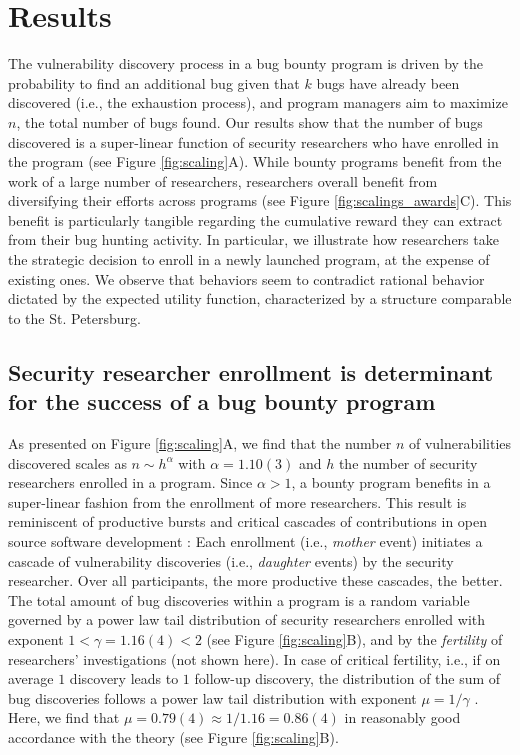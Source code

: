 \section{Results}
\label{sec:results}
The vulnerability discovery process in a bug bounty program is driven by the probability to find an additional bug given that $k$ bugs have already been discovered (i.e., the exhaustion process), and program managers aim to maximize $n$, the total number of bugs found. Our results show that the number of bugs discovered is a super-linear function of security researchers who have enrolled in the program (see Figure \ref{fig:scaling}A). While bounty programs benefit from the work of a large number of researchers, researchers overall benefit from diversifying their efforts across programs (see Figure \ref{fig:scalings_awards}C). This benefit is particularly tangible regarding the cumulative reward they can extract from their bug hunting activity. In particular, we illustrate how researchers take the strategic decision to enroll in a newly launched program, at the expense of existing ones. We observe that behaviors seem to contradict rational behavior dictated by the expected utility function, characterized by a structure comparable to the St. Petersburg.
 
\subsection{Security researcher enrollment is determinant for the success of a bug bounty program}
As presented on Figure \ref{fig:scaling}A, we find that the number $n$ of vulnerabilities discovered scales as $n \sim h^{\alpha}$ with $\alpha = 1.10(3)$ and $h$ the number of security researchers enrolled in a program. Since $\alpha > 1$, a bounty program benefits in a super-linear fashion from the enrollment of more researchers. This result is reminiscent of productive bursts and critical cascades of contributions in open source software development \cite{sornette2014much}: Each enrollment (i.e., {\it mother} event) initiates a cascade of vulnerability discoveries (i.e., {\it daughter} events) by the security researcher. Over all participants, the more productive these cascades, the better. The total amount of bug discoveries within a program is a random variable governed by a power law tail distribution of security researchers enrolled with exponent $1< \gamma = 1.16(4) < 2$ (see Figure \ref{fig:scaling}B), and by the {\it fertility} of researchers' investigations (not shown here). In case of critical fertility, i.e., if on average $1$ discovery leads to $1$ follow-up discovery, the distribution of the sum of bug discoveries follows a power law tail distribution with exponent $\mu = 1/\gamma$ \cite{sornette2014much}. Here, we find that $\mu = 0.79(4) \approx 1/1.16 = 0.86(4)$ in reasonably good accordance with the theory  (see Figure \ref{fig:scaling}B).\\

